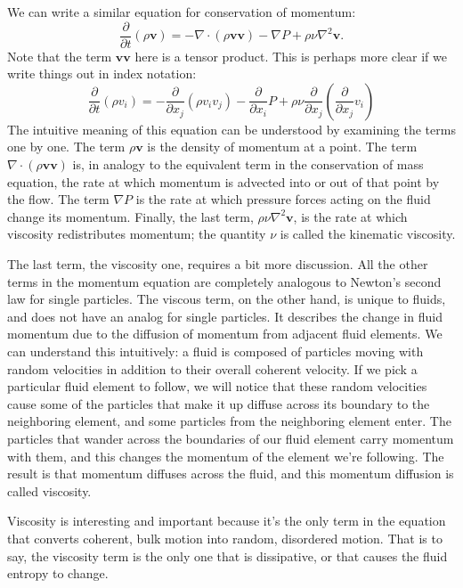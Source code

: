 We can write a similar equation for conservation of momentum:
\begin{equation}
\frac{\partial}{\partial t}(\rho \mathbf{v}) = -\nabla \cdot(\rho \mathbf{v v}) - \nabla P + \rho \nu \nabla^2 \mathbf{v}.
\end{equation}
Note that the term $\mathbf{vv}$ here is a tensor product. This is perhaps more clear if we write things out in index notation:
\begin{equation}
\frac{\partial}{\partial t}(\rho v_i) = -\frac{\partial}{\partial x_j} (\rho v_i v_j) - \frac{\partial}{\partial x_i} P
+ \rho \nu \frac{\partial}{\partial x_j}\left(\frac{\partial}{\partial x_j} v_i\right)
\end{equation}
The intuitive meaning of this equation can be understood by examining the terms one by one. The term $\rho\mathbf{v}$ is the density of momentum at a point. The term $\nabla \cdot(\rho \mathbf{v v})$ is, in analogy to the equivalent term in the conservation of mass equation, the rate at which momentum is advected into or out of that point by the flow. The term $\nabla P$ is the rate at which pressure forces acting on the fluid change its momentum. Finally, the last term, $\rho \nu \nabla^2 \mathbf{v}$, is the rate at which viscosity redistributes momentum; the quantity $\nu$ is called the kinematic viscosity.

The last term, the viscosity one, requires a bit more discussion. All the other terms in the momentum equation are completely analogous to Newton's second law for single particles. The viscous term, on the other hand, is unique to fluids, and does not have an analog for single particles. It describes the change in fluid momentum due to the diffusion of momentum from adjacent fluid elements. We can understand this intuitively: a fluid is composed of particles moving with random velocities in addition to their overall coherent velocity. If we pick a particular fluid element to follow, we will notice that these random velocities cause some of the particles that make it up diffuse across its boundary to the neighboring element, and some particles from the neighboring element enter. The particles that wander across the boundaries of our fluid element carry momentum with them, and this changes the momentum of the element we're following. The result is that momentum diffuses across the fluid, and this momentum diffusion is called viscosity.

Viscosity is interesting and important because it's the only term in the equation that converts coherent, bulk motion into random, disordered motion. That is to say, the viscosity term is the only one that is dissipative, or that causes the fluid entropy to change. 

